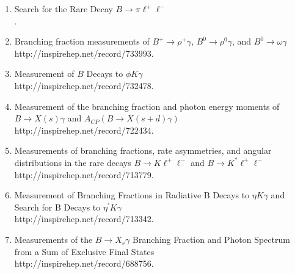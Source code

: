 \documentclass [12pt]{report}
\begin{document}
\begin{enumerate}

\item Search for the Rare Decay $B\rightarrow \pi\ell^+\ell^-$\\
.

\item Branching fraction measurements of $B^+ \rightarrow \rho^+ \gamma$, $B^0 \rightarrow \rho^0 \gamma$, and $B^0 \rightarrow \omega \gamma$\\
{http://inspirehep.net/record/733993}.

\item Measurement of $B$ Decays to $\phi K \gamma$\\
{http://inspirehep.net/record/732478}.

\item Measurement of the branching fraction and photon energy moments of $B \rightarrow X(s) \gamma$ and $A_{CP}(B \rightarrow X(s+d) \gamma)$\\
{http://inspirehep.net/record/722434}.

\item Measurements of branching fractions, rate asymmetries, and angular distributions in the rare decays $B\rightarrow K\ell^+\ell^-$ and $B\rightarrow K^{*}\ell^+\ell^-$\\
{http://inspirehep.net/record/713779}.

\item Measurement of Branching Fractions in Radiative B Decays to $\eta K \gamma$ and Search for B Decays to $\eta^{\prime} K \gamma$\\
{http://inspirehep.net/record/713342}.

\item Measurements of the $B \rightarrow X_s\gamma$ Branching Fraction and Photon Spectrum from a Sum of Exclusive Final States\\
{http://inspirehep.net/record/688756}.


\end{enumerate}
\end{document}
